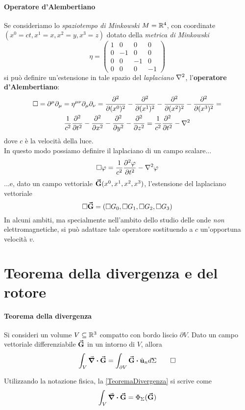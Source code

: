 \paragraph{Operatore d'Alembertiano}\label{dalembertiano}
Se consideriamo lo \textit{spaziotempo di Minkowski} $M=\mathbb{R}^4$, con coordinate $(x^0=ct,x^1=x,x^2=y,x^3=z)$ dotato della \textit{metrica di Minkowski}
\begin{equation*}
	\eta=\begin{pmatrix}
		1 & 0 & 0 & 0\\
		0 & -1 & 0 & 0\\
		0 & 0 & -1 & 0\\
		0 & 0 & 0 & -1
	\end{pmatrix}
\end{equation*}
si può definire un'estensione in tale spazio del \textit{laplaciano} $\laplacian$, l'\textbf{operatore d'Alembertiano}:
\begin{multline}
	\Box=\partial^{\mu}\partial_{\mu}=\eta^{\mu\nu}\partial_{\mu}\partial_{\nu}=\pdv[2]{(x^0)}-\pdv[2]{(x^1)}-\pdv[2]{(x^2)}-\pdv[2]{(x^3)}=\\
	\frac{1}{c^2}\pdv[2]{t}-\pdv[2]{x}-\pdv[2]{y}-\pdv[2]{z}=\frac{1}{c^2}\pdv[2]{t}-\laplacian
\end{multline}
dove $c$ è la velocità della luce.\\
In questo modo possiamo definire il laplaciano di un campo scalare...
\begin{equation}
	\Box\phi=\frac{1}{c^2}\pdv[2]{\phi}{t}-\laplacian{\phi}
\end{equation}
...e, dato un campo vettoriale $\vb*{\va{G}}(x^0, x^1, x^2, x^3)$, l'estensione del laplaciano vettoriale
\begin{equation}
	\Box{\vb*{\va{G}}}=\left(\Box{G_0},\Box{G_1},\Box{G_2},\Box{G_3}\right)
\end{equation}  
In alcuni ambiti, ma specialmente nell'ambito dello studio delle onde \textit{non} elettromagnetiche, si può adattare tale operatore sostituendo a $c$ un'opportuna velocità $v$. %
\section{Teorema della divergenza e del rotore}
\paragraph{Teorema della divergenza}
\begin{theoremaqed}
	Si consideri un volume $V\subseteq\mathbb{R}^3$ compatto con bordo liscio $\partial V$. Dato un campo vettoriale differenziabile $\vb*{\va{G}}$ in un intorno di $V$, allora
	\begin{equation}
		\int_V\div{\vba{G}}=\int_{\partial V}\vba{G}\vdot \vbh{u}_nd\Sigma\label{TeoremaDivergenza}\qedhere
	\end{equation}
\end{theoremaqed}
Utilizzando la notazione fisica, la \ref{TeoremaDivergenza} si scrive come
\begin{equation}
	\int_V\div{\vb*{\va{G}}}=\Phi_\Sigma(\vb*{\va{G}})
\end{equation}
